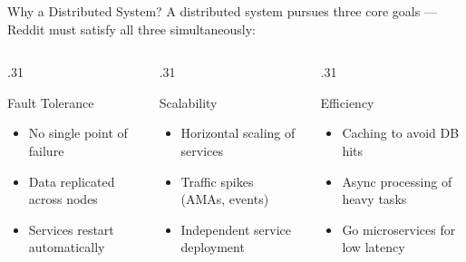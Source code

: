 \documentclass[
  aspectratio=169,
]{beamer}
\begin{document}
\begin{frame}{Why a Distributed System?}
  A distributed system pursues three core goals — Reddit must satisfy all three simultaneously:
  \vspace{3mm}
  \begin{columns}[T]
    \begin{column}{.31\textwidth}
      \begin{block}{Fault Tolerance}
        \begin{itemize}
          \item No single point of failure
          \item Data replicated across nodes
          \item Services restart automatically
        \end{itemize}
      \end{block}
    \end{column}
    \begin{column}{.31\textwidth}
      \begin{block}{Scalability}
        \begin{itemize}
          \item Horizontal scaling of services
          \item Traffic spikes (AMAs, events)
          \item Independent service deployment
        \end{itemize}
      \end{block}
    \end{column}
    \begin{column}{.31\textwidth}
      \begin{block}{Efficiency}
        \begin{itemize}
          \item Caching to avoid DB hits
          \item Async processing of heavy tasks
          \item Go microservices for low latency
        \end{itemize}
      \end{block}
    \end{column}
  \end{columns}
\end{frame}
\end{document}

